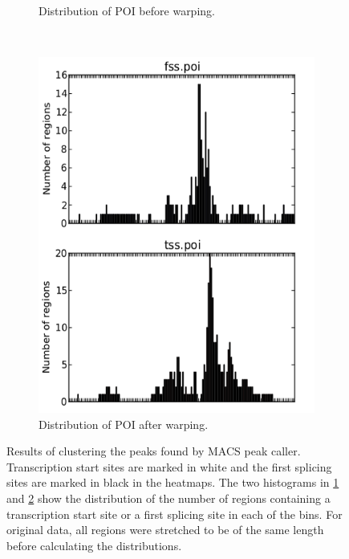 \documentclass[parskip]{cs4rep}
\begin{document}
\begin{figure}
\begin{subfigure}[b]{0.3\textwidth}
        \caption{Distribution of POI before warping.}
        \label{fig:evaluation:macs-peaks:histogram-original}
    \end{subfigure}
    ~
    \begin{subfigure}[b]{0.3\textwidth}
         \centering
        \includegraphics[width=\textwidth]{figures/evaluation/macs-peaks/cluster-35-warped-histogram-clean.png}
        \caption{Distribution of POI after warping.}
        \label{fig:evaluation:macs-peaks:histogram-warped}
    \end{subfigure}
    \caption{Results of clustering the peaks found by MACS peak caller. Transcription start sites are marked in white and the first splicing sites are marked in black in the heatmaps. The two histograms in \ref{fig:evaluation:macs-peaks:histogram-original} and \ref{fig:evaluation:macs-peaks:histogram-warped} show the distribution of the number of regions containing a transcription start site or a first splicing site in each of the bins. For original data, all regions were stretched to be of the same length before calculating the distributions.}
    \label{fig:evaluation:macs-peaks}
\end{figure}
\end{document}
